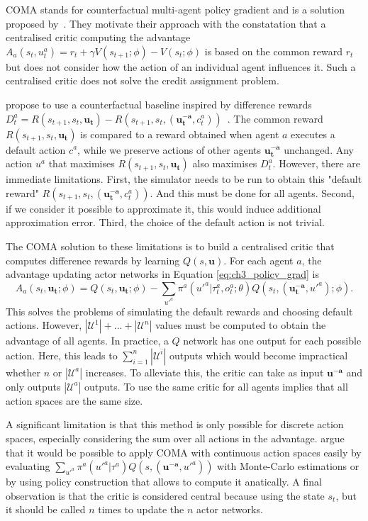 COMA stands for counterfactual multi-agent policy gradient and is a solution proposed by~\cite{foerster2017coma}.
They motivate their approach with the constatation that a centralised critic computing the advantage $A_a(s_t, u^a_t) = r_t + \gamma V(s_{t+1}; \phi) - V(s_t; \phi)$ is based on the common reward $r_t$ but does not consider how the action of an individual agent influences it.
Such a centralised critic does not solve the credit assignment problem.

\cite{foerster2017coma} propose to use a counterfactual baseline inspired by difference rewards $D_t^a=R(s_{t+1}, s_t, \mathbf{u_t}) - R(s_{t+1}, s_t, (\mathbf{u_t^{-a}}, c_t^a))$~\citep{wolpert2001optimal}.
The common reward $R(s_{t+1}, s_t, \mathbf{u_t})$ is compared to a reward obtained when agent $a$ executes a default action $c^a$, while we preserve actions of other agents $\mathbf{u_t^{-a}}$ unchanged.
Any action $u^a$ that maximises $R(s_{t+1}, s_t, \mathbf{u_t})$ also maximises $D_t^a$.
However, there are immediate limitations.
First, the simulator needs to be run to obtain this "default reward" $R(s_{t+1}, s_t, (\mathbf{u_t^{-a}}, c_t^a))$.
And this must be done for all agents.
Second, if we consider it possible to approximate it, this would induce additional approximation error.
Third, the choice of the default action is not trivial.

The COMA solution to these limitations is to build a centralised critic that computes difference rewards by learning $Q(s, \mathbf{u})$.
For each agent $a$, the advantage updating actor networks in Equation \ref{eq:ch3_policy_grad} is 
\begin{equation}
\label{eq:ch3_coma_adv}
A_a(s_t,\mathbf{u_t}; \phi)=Q(s_t, \mathbf{u_t};\phi) - \sum_{u'^{a}} \pi^a({u'^{a}} |\tau_t^a, o_t^a;\theta) Q(s_t, (\mathbf{u_t^{-a}}, u'^{a}); \phi).
\end{equation}
This solves the problems of simulating the default rewards and choosing default actions.
However, $|\mathcal{U}^1|+...+|\mathcal{U}^n|$ values must be computed to obtain the advantage of all agents.
In practice, a $Q$ network has one output for each possible action.
Here, this leads to $\sum_{i=1}^n|\mathcal{U}^i|$ outputs which would become impractical whether $n$ or $|\mathcal{U}^a|$ increases.
To alleviate this, the critic can take as input $\mathbf{u^{-a}}$ and only outputs $|\mathcal{U}^a|$ outputs.
To use the same critic for all agents implies that all action spaces are the same size.

A significant limitation is that this method is only possible for discrete action spaces, especially considering the sum over all actions in the advantage.
\cite{foerster2017coma} argue that it would be possible to apply COMA with continuous action spaces easily by evaluating $\sum_{u'^{a}} \pi^a(u'^{a}|\tau^a) Q(s,(\mathbf{u^{-a}},u'^{a}))$ with Monte-Carlo estimations or by using policy construction that allows to compute it anatically.
A final observation is that the critic is considered central because using the state $s_t$, but it should be called $n$ times to update the $n$ actor networks.

